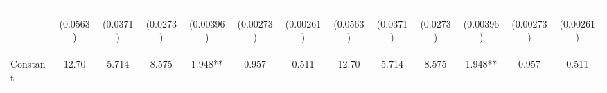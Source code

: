 \documentclass[]{article}
\begin{document}
\begin{center}
\begin{tabular}{lcccccccccccc}
\vspace{4pt} & \begin{footnotesize}(0.0563)\end{footnotesize} & \begin{footnotesize}(0.0371)\end{footnotesize} & \begin{footnotesize}(0.0273)\end{footnotesize} & \begin{footnotesize}(0.00396)\end{footnotesize} & \begin{footnotesize}(0.00273)\end{footnotesize} & \begin{footnotesize}(0.00261)\end{footnotesize} & \begin{footnotesize}(0.0563)\end{footnotesize} & \begin{footnotesize}(0.0371)\end{footnotesize} & \begin{footnotesize}(0.0273)\end{footnotesize} & \begin{footnotesize}(0.00396)\end{footnotesize} & \begin{footnotesize}(0.00273)\end{footnotesize} & \begin{footnotesize}(0.00261)\end{footnotesize} \\
Constant & 12.70 & 5.714 & 8.575 & 1.948** & 0.957 & 0.511 & 12.70 & 5.714 & 8.575 & 1.948** & 0.957 & 0.511 \\

\end{tabular}
\end{center}
\end{document}
